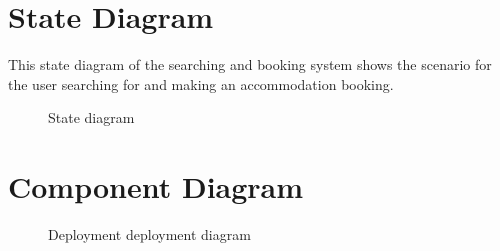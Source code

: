 \documentclass[a4paper]{article}
\begin{document}
\section{State Diagram}

This state diagram of the searching and booking system shows the scenario for
the user searching for and making an accommodation booking.

\begin{figure}[h!]
	\centering
	\caption{State diagram}
\end{figure}
\clearpage

\section{Component Diagram}
\begin{figure}[h!]
	\centering
	\caption{Deployment deployment diagram}
\end{figure}
\clearpage
\end{document}
